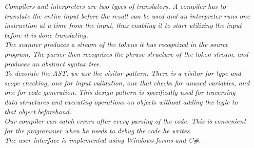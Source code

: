 \vspace{30pt}

\textit{Compilers and interpreters are two types of translators. A compiler has to translate the entire input before the result can be used and an interpreter runs one instruction at a time from the input, thus enabling it to start utilizing the input before it is done translating.\\ \indent
  The scanner produces a stream of the tokens it has recognized in the source program. The parser then recognizes the phrase structure of the token stream, and produces an abstract syntax tree.\\ \indent
  To decorate the AST, we use the visitor pattern. There is a visitor for type and scope checking, one for input validation, one that checks for unused variables, and one for code generation.
This design pattern is specifically used for traversing data structures and executing operations on objects without adding the logic to that object beforehand.\\ \indent
  Our compiler can catch errors after every parsing of the code. This is convenient for the programmer when he needs to debug the code he writes.\\ \indent
  The user interface is implemented using Windows forms and C\#. }
	
